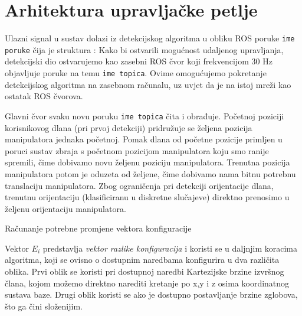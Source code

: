 \documentclass[times, utf8, diplomski, numeric]{fer}
\begin{document}
\section{Arhitektura upravljačke petlje}\label{arhitektura}
Ulazni signal u sustav dolazi iz detekcijskog algoritma u obliku ROS poruke \verb|ime poruke| čija je struktura :
Kako bi ostvarili mogućnost udaljenog upravljanja, detekcijski dio ostvarujemo kao zasebni ROS čvor koji frekvencijom 30 Hz objavljuje poruke na temu \verb|ime topica|.
Ovime omogućujemo pokretanje detekcijskog algoritma na zasebnom računalu, uz uvjet da je na istoj mreži kao ostatak ROS čvorova.

Glavni čvor svaku novu poruku \verb|ime topica| čita i obrađuje.
Početnoj poziciji korisnikovog dlana (pri prvoj detekciji) pridružuje se željena pozicija manipulatora jednaka početnoj.
Pomak dlana od početne pozicije primljen u poruci sustav zbraja s početnom pozicijom manipulatora koju smo ranije spremili, čime dobivamo novu željenu poziciju manipulatora.
Trenutna pozicija manipulatora potom je oduzeta od željene, čime dobivamo nama bitnu potrebnu translaciju manipulatora.
Zbog ograničenja pri detekciji orijentacije dlana, trenutnu orijentaciju (klasificiranu u diskretne slučajeve) direktno prenosimo u željenu orijentaciju manipulatora.

\begin{algorithm}[H]
\caption{Računanje potrebne promjene vektora konfiguracije}
\begin{algorithmic}
\ENDIF
{}
\ENDIF
{}
\ENDFOR
\end{algorithmic}
\end{algorithm}

Vektor $E_i$ predstavlja \textit{vektor razlike konfiguracija} i koristi se u daljnjim koracima algoritma, koji se ovisno o dostupnim naredbama konfigurira u dva različita oblika.
Prvi oblik se koristi pri dostupnoj naredbi Kartezijske brzine izvršnog člana, kojom možemo direktno narediti kretanje po x,y i z osima koordinatnog sustava baze.
Drugi oblik koristi se ako je dostupno postavljanje brzine zglobova, što ga čini složenijim.
\end{document}
